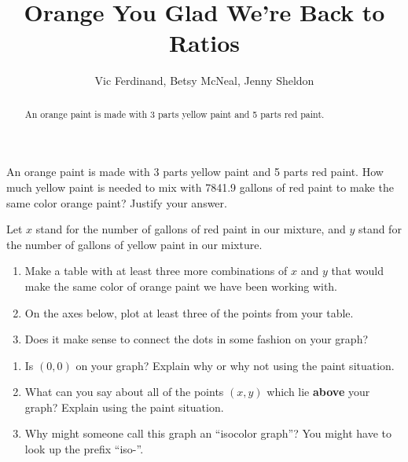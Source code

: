 \documentclass{ximera}
\title{Orange You Glad We're Back to Ratios}
\author{Vic Ferdinand, Betsy McNeal, Jenny Sheldon}
\begin{document}
\begin{abstract}
An orange paint is made with 3 parts yellow paint and 5 parts red paint. 
\end{abstract}
\maketitle



\begin{problem} \label{Orange1}
 An orange paint is made with 3 parts yellow paint and 5 parts red paint.  How much yellow paint is needed to mix with 7841.9 gallons of red paint to make the same color orange paint?  Justify your answer.

\end{problem}
 
 
 

\begin{problem} \label{Orange2}
Let $x$ stand for the number of gallons of red paint in our mixture, and $y$ stand for the number of gallons of yellow paint in our mixture.
\begin{enumerate}
    \item Make a table with at least three more combinations of $x$ and $y$ that would make the same color of orange paint we have been working with.
    \item On the axes below, plot at least three of the points from your table.
    \item Does it make sense to connect the dots in some fashion on your graph?
\end{enumerate}


\begin{center}
\end{center}
\end{problem}





\begin{problem} \label{Orange3}
\begin{enumerate}
    \item Is $(0,0)$ on your graph?  Explain why or why not using the paint situation.
    \item What can you say about all of the points $(x,y)$ which lie {\bf above} your graph?  Explain using the paint situation.
    \item Why might someone call this graph an ``isocolor graph''?  You might have to look up the prefix ``iso-''.
\end{enumerate}
\end{problem}
\end{document}

